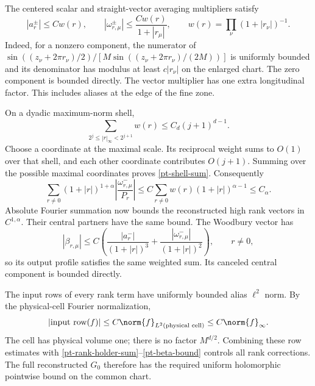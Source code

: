 The centered scalar and straight-vector averaging multipliers satisfy
\begin{equation}\label{pt-alias-weights}
 |a_r^\pm|\le Cw(r),\qquad
 |\omega_{r,\mu}^\pm|\le\frac{Cw(r)}{1+|r_\mu|},\qquad
 w(r)=\prod_\nu(1+|r_\nu|)^{-1}.
\end{equation}
Indeed, for a nonzero component, the numerator of
$\sin((z_\nu+2\pi r_\nu)/2)/
 [M\sin((z_\nu+2\pi r_\nu)/(2M))]$
is uniformly bounded and its denominator has modulus at least
$c|r_\nu|$ on the enlarged chart. The zero component is bounded
directly. The vector multiplier has one extra longitudinal factor.
This includes aliases at the edge of the fine zone.

On a dyadic maximum-norm shell,
\begin{equation}\label{pt-shell-sum}
 \sum_{2^j\le|r|_\infty<2^{j+1}}w(r)
                      \le C_d(j+1)^{d-1}.
\end{equation}
Choose a coordinate at the maximal scale. Its reciprocal weight sums
to $O(1)$ over that shell, and each other coordinate contributes
$O(j+1)$. Summing over the possible maximal coordinates proves
\eqref{pt-shell-sum}. Consequently
\begin{equation}\label{pt-rank-holder-sum}
 \sum_{r\ne0}(1+|r|)^{1+\alpha}
             \left|\frac{\omega_{r,\mu}^-}{P_r}\right|
   \le C\sum_{r\ne0}w(r)(1+|r|)^{\alpha-1}
   \le C_\alpha.
\end{equation}
Absolute Fourier summation now bounds the reconstructed high rank
vectors in $C^{1,\alpha}$. Their central partners have the same bound.
The Woodbury vector has
\begin{equation}\label{pt-beta-bound}
 |\beta_{r,\mu}|
  \le C\left(\frac{|a_r^-|}{(1+|r|)^3}
                  +\frac{|\omega_{r,\mu}^-|}{(1+|r|)^2}\right),
       \qquad r\ne0,
\end{equation}
so its output profile satisfies the same weighted sum. Its canceled
central component is bounded directly.

The input rows of every rank term have uniformly bounded alias
$\ell^2$ norm. By the physical-cell Fourier normalization,
\[
 |\text{input row}(f)|
       \le C\norm{f}_{L^2(\text{physical cell})}
       \le C\norm{f}_\infty.
\]
The cell has physical volume one; there is no factor $M^{d/2}$.
Combining these row estimates with
\eqref{pt-rank-holder-sum}--\eqref{pt-beta-bound} controls all rank
corrections. The full reconstructed $G_0$ therefore has the required
uniform holomorphic pointwise bound on the common chart.

